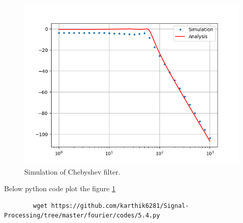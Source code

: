 \documentclass[journal,12pt,twocolumn]{IEEEtran}
\renewcommand\thesection{\arabic{section}}
\begin{document}
\begin{enumerate}[label=\thesection.\arabic*
	,ref=\thesection.\theenumi]
	\begin{figure}
		\includegraphics[width=\columnwidth]{figs/5.4.png}
		\caption{Simulation of Chebyshev filter.}
		\label{fig:sim-cheby}
	\end{figure}
	Below python code plot the figure \ref{fig:sim-cheby}
	\begin{lstlisting}
		wget https://github.com/karthik6281/Signal-Processing/tree/master/fourier/codes/5.4.py
	\end{lstlisting} 
\end{enumerate}
\end{document}
